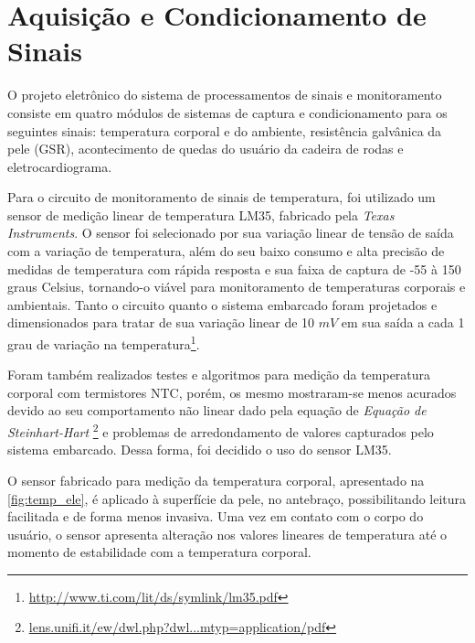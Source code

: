 \section{Aquisição e Condicionamento de Sinais}

O projeto eletrônico do sistema de processamentos de sinais e monitoramento
consiste em quatro módulos de sistemas de captura e condicionamento para os
seguintes sinais: temperatura corporal e do ambiente, resistência galvânica da pele
(GSR), acontecimento de quedas do usuário da cadeira de rodas e eletrocardiograma.

Para o circuito de monitoramento de sinais de temperatura, foi utilizado um sensor
de medição linear de temperatura LM35, fabricado pela \textit{Texas Instruments}.
O sensor foi selecionado por sua variação linear de tensão de saída com a
variação de temperatura, além do seu baixo consumo e alta precisão de medidas
de temperatura com rápida resposta e sua faixa de captura de -55 à 150 graus Celsius,
tornando-o viável para monitoramento de temperaturas corporais e ambientais.
Tanto o circuito quanto o sistema embarcado foram projetados e dimensionados
para tratar de sua variação linear de 10 $mV$ em sua saída a cada 1 grau de variação
na temperatura\footnote{\url{http://www.ti.com/lit/ds/symlink/lm35.pdf}}.

Foram também realizados testes e algoritmos para medição da temperatura corporal com
termistores NTC, porém, os mesmo mostraram-se menos acurados devido ao seu comportamento
não linear dado pela equação de \textit{Equação de Steinhart-Hart}
\footnote{\url{lens.unifi.it/ew/dwl.php?dwl...mtyp=application/pdf}} e problemas de arredondamento
de valores capturados pelo sistema embarcado. Dessa forma, foi decidido o uso do sensor LM35.

O sensor fabricado para medição da temperatura corporal, apresentado na \ref{fig:temp_ele},
é aplicado à superfície da pele, no antebraço, possibilitando leitura facilitada
e de forma menos invasiva. Uma vez em contato com o corpo do usuário,
o sensor apresenta alteração nos valores lineares de temperatura até o momento de
estabilidade com a temperatura corporal.

